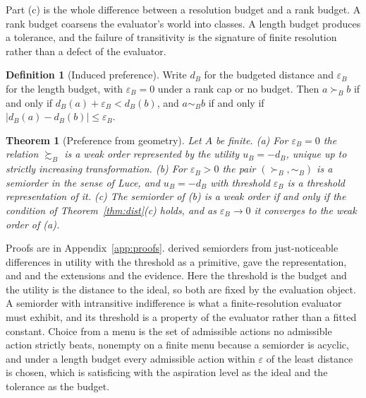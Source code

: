 \documentclass{article}
\newtheorem{theorem}{Theorem}
\theoremstyle{definition}
\newtheorem{definition}{Definition}
\theoremstyle{remark}
\begin{document}
Part (c) is the whole difference between a resolution budget and a rank budget.
A rank budget coarsens the evaluator's world into classes.
A length budget produces a tolerance, and the failure of transitivity is the signature of finite resolution rather than a defect of the evaluator.

\begin{definition}[Induced preference]
\label{def:pref}
Write $d_{B}$ for the budgeted distance and $\varepsilon_{B}$ for the length budget, with $\varepsilon_{B}=0$ under a rank cap or no budget.
Then $a\succ_{B}b$ if and only if $d_{B}(a)+\varepsilon_{B}<d_{B}(b)$, and $a\sim_{B}b$ if and only if $|d_{B}(a)-d_{B}(b)|\le\varepsilon_{B}$.
\end{definition}

\begin{theorem}[Preference from geometry]
\label{thm:pref}
Let $A$ be finite.
(a) For $\varepsilon_{B}=0$ the relation $\succsim_{B}$ is a weak order represented by the utility $u_{B}=-d_{B}$, unique up to strictly increasing transformation.
(b) For $\varepsilon_{B}>0$ the pair $(\succ_{B},\sim_{B})$ is a semiorder in the sense of Luce, and $u_{B}=-d_{B}$ with threshold $\varepsilon_{B}$ is a threshold representation of it.
(c) The semiorder of (b) is a weak order if and only if the condition of Theorem~\ref{thm:dist}(c) holds, and as $\varepsilon_{B}\to0$ it converges to the weak order of (a).
\end{theorem}

Proofs are in Appendix~\ref{app:proofs}.
\citet{luce1956} derived semiorders from just-noticeable differences in utility with the threshold as a primitive, \citet{scott1958} gave the representation, and \citet{fishburn1970} and \citet{tversky1969} the extensions and the evidence.
Here the threshold is the budget and the utility is the distance to the ideal, so both are fixed by the evaluation object.
A semiorder with intransitive indifference is what a finite-resolution evaluator must exhibit, and its threshold is a property of the evaluator rather than a fitted constant.
Choice from a menu is the set of admissible actions no admissible action strictly beats, nonempty on a finite menu because a semiorder is acyclic, and under a length budget every admissible action within $\varepsilon$ of the least distance is chosen, which is satisficing \citep{simon1955} with the aspiration level as the ideal and the tolerance as the budget.
\end{document}
